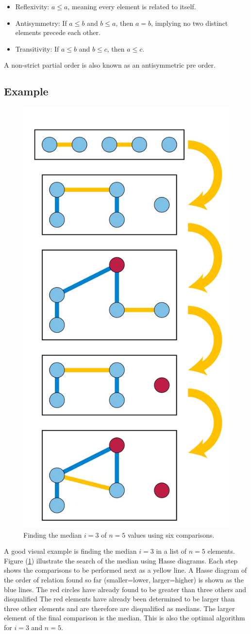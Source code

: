 \documentclass[10pt,journal,compsoc]{IEEEtran}
\begin{document}
\begin{itemize}
  \item Reflexivity: $a \leq a$, meaning every element is related to itself.
  \item Antisymmetry: If $a \leq b$ and $b \leq a$, then $a = b$, implying no two distinct elements
        precede each other.
  \item Transitivity: If $a \leq b$ and $b \leq c$, then $a \leq c$.
\end{itemize}


A non-strict partial order is also known as an antisymmetric pre order.

\subsection{Example}
\begin{figure}[h!]
  \centering
  \includegraphics[width=0.5\columnwidth]{figures/Median_of_5.svg.png}
  \caption{Finding the median $i=3$ of $n=5$ values using six comparisons.}
  \label{fig:median_of_5}
\end{figure}
A good visual example is finding the median $i=3$ in a list of $n=5$ elements. Figure
(\ref{fig:median_of_5}) illustrate the search of the median using Hasse diagrams. Each step shows
the comparisons to be performed next as a yellow line. A Hasse diagram of the order of relation
found so far (smaller=lower, larger=higher) is shown as the blue lines. The red circles have already
found to be greater than three others and disqualified The red elements have already been determined
to be larger than three other elements and are therefore are disqualified as medians. The larger
element of the final comparison is the median. This is also the optimal algorithm for $i=3$ and
$n=5$.
\end{document}
